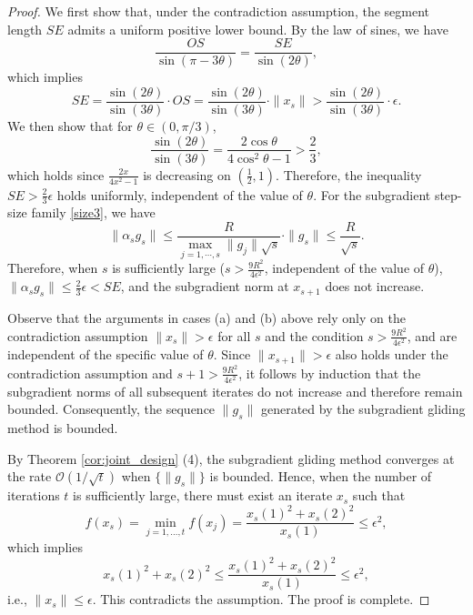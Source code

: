 \documentclass[sn-mathphys]{JORSC-jnl}%
\theoremstyle{thmstyleone}%
\theoremstyle{thmstylethree}%
\begin{document}
\begin{proof}
	We first show that, under the contradiction assumption, the segment length $SE$ admits a uniform positive lower bound. By the law of sines, we have
	\begin{equation*}
		\frac{OS}{\sin(\pi-3\theta)} = \frac{SE}{\sin(2\theta)},
	\end{equation*}
	which implies
	\begin{equation*}
		SE = \frac{\sin(2\theta)}{\sin(3\theta)}\cdot OS = \frac{\sin(2\theta)}{\sin(3\theta)}\cdot \|x_s\| > \frac{\sin(2\theta)}{\sin(3\theta)}\cdot \epsilon.
	\end{equation*}
	We then show that for $\theta \in (0, \pi/3)$, 
	\begin{equation*}
		\frac{\sin(2\theta)}{\sin(3\theta)} = \frac{2\cos\theta}{4\cos^2\theta - 1} > \frac{2}{3},
	\end{equation*}
	which holds since $\frac{2x}{4x^2-1}$ is decreasing on $(\frac{1}{2}, 1)$.	Therefore, the inequality $ SE > \frac{2}{3}\epsilon $ holds uniformly, independent of the value of $\theta$. For the subgradient step-size family \eqref{size3}, we have
		\begin{equation*}
				\|\alpha_s g_s\|
				\le
				\frac{R}{\max_{j=1,\cdots,s}\|g_j\|\sqrt{s}} \cdot \|g_s\|
				\le
				\frac{R}{\sqrt{s}}.
			\end{equation*}
	Therefore, when $s$ is sufficiently large ($s > \frac{9R^2}{4\epsilon^2}$, independent of the value of $\theta$), $\|\alpha_s g_s\| \le \frac{2}{3}\epsilon < SE$, and the subgradient norm at $x_{s+1}$ does not increase.
	
	Observe that the arguments in cases (a) and (b) above rely only on the contradiction assumption $\|x_s\| > \epsilon$ for all $s$ and the condition $s > \frac{9R^2}{4\epsilon^2}$, and are independent of the specific value of $\theta$. Since $\|x_{s+1}\| > \epsilon$ also holds under the contradiction assumption and $s+1 > \frac{9R^2}{4\epsilon^2}$, it follows by induction that the subgradient norms of all subsequent iterates do not increase and therefore remain bounded. Consequently, the sequence ${\|g_s\|}$ generated by the subgradient gliding method is bounded.
	
	By Theorem \ref{cor:joint_design} (4), the subgradient gliding method converges at the rate $\mathcal{O}(1/\sqrt{t})$ when $\{\|g_s\|\}$ is bounded. Hence, when the number of iterations $t$ is sufficiently large, there must exist an iterate $x_s$ such that 
	\begin{equation*}
		f(x_s) = \min_{j=1,\ldots,t} f(x_j) = \frac{x_s(1)^2 + x_s(2)^2}{x_s(1)} \le \epsilon^2,
	\end{equation*}
	which implies
	\begin{equation*}
		x_s(1)^2 + x_s(2)^2 \le \frac{x_s(1)^2 + x_s(2)^2}{x_s(1)} \le \epsilon^2,
	\end{equation*}
	i.e., $\|x_s\| \le \epsilon$. This contradicts the assumption. The proof is complete.
\end{proof}
\end{document}
